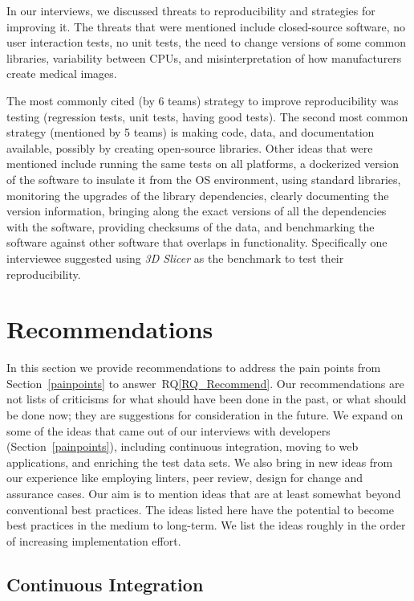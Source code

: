 \documentclass[final, 3p, times, authoryear]{elsarticle}
\newcommand{\rqref}[1]{RQ\ref{#1}}
\begin{document}
\begin{enumerate}
In our interviews, we discussed threats to reproducibility and strategies for
improving it.  The threats that were mentioned include closed-source software,
no user interaction tests, no unit tests, the need to change versions of some
common libraries, variability between CPUs, and misinterpretation of how
manufacturers create medical images. 

The most commonly cited (by 6 teams) strategy to improve reproducibility was
testing (regression tests, unit tests, having good tests). The second most
common strategy (mentioned by 5 teams) is making code, data, and documentation
available, possibly by creating open-source libraries.  Other ideas that were
mentioned include running the same tests on all platforms, a dockerized version
of the software to insulate it from the OS environment, using standard
libraries, monitoring the upgrades of the library dependencies, clearly
documenting the version information, bringing along the exact versions of all
the dependencies with the software, providing checksums of the data, and
benchmarking the software against other software that overlaps in functionality.
Specifically one interviewee suggested using \textit{3D Slicer} as the benchmark
to test their reproducibility.

\end{enumerate}

\section{Recommendations} \label{ch_recommendations}

In this section we provide recommendations to address the pain points from
Section~\ref{painpoints} to answer~\rqref{RQ_Recommend}.  Our recommendations
are not lists of criticisms for what should have been done in the past, or what
should be done now; they are suggestions for consideration in the future. We
expand on some of the ideas that came out of our interviews with developers
(Section~\ref{painpoints}), including continuous integration, moving to web
applications, and enriching the test data sets. We also bring in new ideas from
our experience like employing linters, peer review, design for change and
assurance cases.  Our aim is to mention ideas that are at least somewhat beyond
conventional best practices. The ideas listed here have the potential to become
best practices in the medium to long-term. We list the ideas roughly in the
order of increasing implementation effort.

\subsection{Continuous Integration} \label{Sec_ContinuousIntegration}
\end{document}
